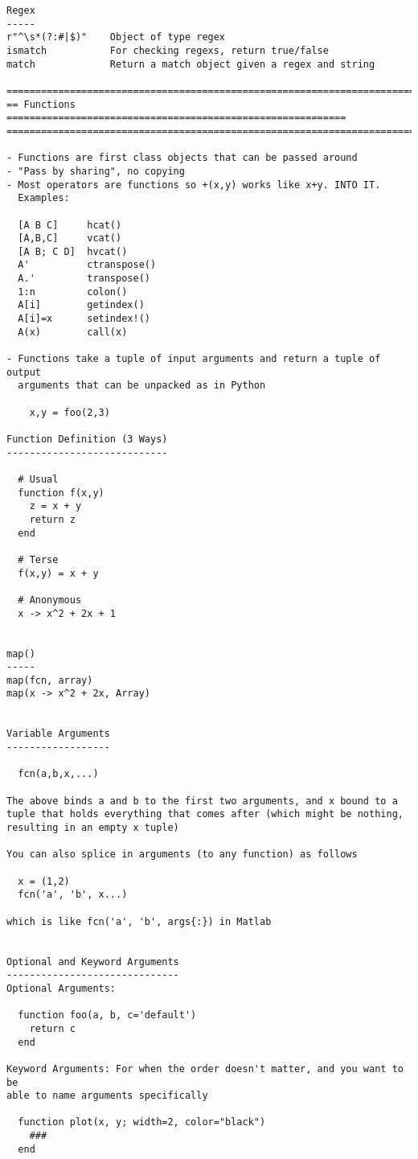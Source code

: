 \documentclass[12pt]{article}
\theoremstyle{plain}
\theoremstyle{definition}
\theoremstyle{remark}
\begin{document}
\begin{lstlisting}
Regex
-----
r"^\s*(?:#|$)"    Object of type regex
ismatch           For checking regexs, return true/false
match             Return a match object given a regex and string

========================================================================
== Functions ===========================================================
========================================================================

- Functions are first class objects that can be passed around
- "Pass by sharing", no copying
- Most operators are functions so +(x,y) works like x+y. INTO IT.
  Examples:

  [A B C]     hcat()
  [A,B,C]     vcat()
  [A B; C D]  hvcat()
  A'          ctranspose()
  A.'         transpose()
  1:n         colon()
  A[i]        getindex()
  A[i]=x      setindex!()
  A(x)        call(x)

- Functions take a tuple of input arguments and return a tuple of output
  arguments that can be unpacked as in Python

    x,y = foo(2,3)

Function Definition (3 Ways)
----------------------------

  # Usual
  function f(x,y)
    z = x + y
    return z
  end

  # Terse
  f(x,y) = x + y

  # Anonymous
  x -> x^2 + 2x + 1


map()
-----
map(fcn, array)
map(x -> x^2 + 2x, Array)


Variable Arguments
------------------

  fcn(a,b,x,...)

The above binds a and b to the first two arguments, and x bound to a
tuple that holds everything that comes after (which might be nothing,
resulting in an empty x tuple)

You can also splice in arguments (to any function) as follows

  x = (1,2)
  fcn('a', 'b', x...)

which is like fcn('a', 'b', args{:}) in Matlab


Optional and Keyword Arguments
------------------------------
Optional Arguments:

  function foo(a, b, c='default')
    return c
  end

Keyword Arguments: For when the order doesn't matter, and you want to be
able to name arguments specifically

  function plot(x, y; width=2, color="black")
    ###
  end


\end{lstlisting}
\end{document}
